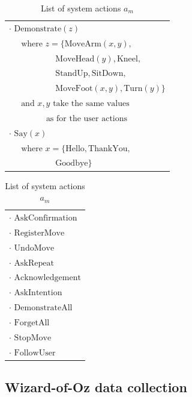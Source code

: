 \begin{table}[h]
\begin{footnotesize}
\begin{tabular}{p{60mm}} 
$\cdot$ $\mathrm{Demonstrate}(z)$ \\ $\ \ \ \ \ \text { where } z = \{\mathrm{MoveArm}(x,y), $ \\ $\ \ \ \ \ \ \ \ \ \ \ \ \ \ \ \ \ \ \ \ \ \ \ \ \  \mathrm{MoveHead}(y),\mathrm{Kneel}, $ \\ $\ \ \ \ \ \ \ \ \ \ \ \ \ \ \ \ \ \ \ \ \ \ \ \ \  \mathrm{StandUp},\mathrm{SitDown}, $ \\ $\ \ \ \ \ \ \ \ \ \ \ \ \ \ \ \ \ \ \ \ \ \ \ \ \  \mathrm{MoveFoot}(x,y), \mathrm{Turn}(y)\}$ \\ $\ \ \ \ \ \text{ and } x, y \text{ take the same values}$ \\ $\ \ \ \ \ \ \ \ \ \ \ \ \ \ \ \ \ \ \ \ \text{as for the user actions}$ \\
$\cdot$ $\mathrm{Say}(x)$ \\  $ \ \ \ \ \  \text{ where } x = \{\mathrm{Hello, ThankYou,}$ \\ $\ \ \ \ \ \ \ \ \ \ \ \ \ \ \ \ \ \ \ \ \ \ \ \ \  \mathrm{Goodbye}\}$
\end{tabular}
\hspace{2cm}
\begin{tabular}{p{60mm}} 
$\cdot$ $\mathrm{AskConfirmation}$ \\
$\cdot$ $\mathrm{RegisterMove}$ \\
$\cdot$ $\mathrm{UndoMove}$ \\
$\cdot$ $\mathrm{AskRepeat}$ \\
$\cdot$ $\mathrm{Acknowledgement}$ \\
$\cdot$ $\mathrm{AskIntention}$ \\
$\cdot$ $\mathrm{DemonstrateAll}$ \\
$\cdot$ $\mathrm{ForgetAll}$ \\
$\cdot$ $\mathrm{StopMove}$ \\
$\cdot$ $\mathrm{FollowUser}$ 

\end{tabular}
\end{footnotesize}
\caption{List of system actions $a_m$} 
\label{table:systemdas}
\end{table}

\subsection{Wizard-of-Oz data collection}
\label{sec:wozlearning-experiments-woz}

